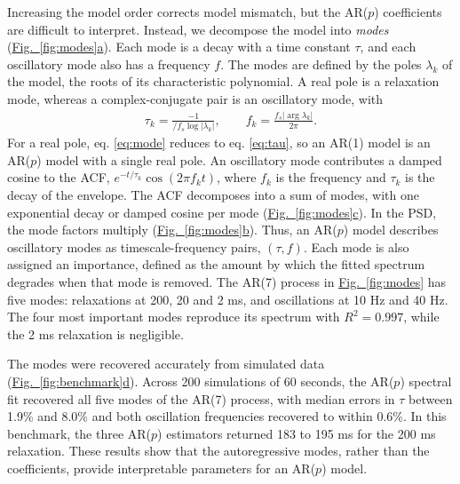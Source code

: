 \documentclass[pdflatex,lineno,sn-nature]{sn-jnl}
\newcommand{\figpanel}[3][]{\hyperref[#2]{Fig.~#1\ref*{#2}#3}}
\theoremstyle{thmstyleone}
\theoremstyle{thmstyletwo}
\theoremstyle{thmstylethree}
\begin{document}
Increasing the model order corrects model mismatch, but the AR($p$) coefficients are difficult to interpret. Instead, we decompose the model into \emph{modes} (\figpanel{fig:modes}{a}). Each mode is a decay with a time constant $\tau$, and each oscillatory mode also has a frequency $f$. The modes are defined by the poles $\lambda_k$ of the model, the roots of its characteristic polynomial. A real pole is a relaxation mode, whereas a complex-conjugate pair is an oscillatory mode, with
\begin{align}
\tau_k = \frac{-1}{/f_s \log|\lambda_k|}, \qquad f_k = \frac{f_s |\arg \lambda_k|}{2\pi}. \label{eq:mode}
\end{align}
For a real pole, eq. \ref{eq:mode} reduces to eq. \ref{eq:tau}, so an AR(1) model is an AR($p$) model with a single real pole. An oscillatory mode contributes a damped cosine to the ACF, $e^{-t/\tau_k}\cos(2\pi f_k t)$, where $f_k$ is the frequency and $\tau_k$ is the decay of the envelope. The ACF decomposes into a sum of modes, with one exponential decay or damped cosine per mode (\figpanel{fig:modes}{c}). In the PSD, the mode factors multiply (\figpanel{fig:modes}{b}). Thus, an AR($p$) model describes oscillatory modes as timescale-frequency pairs, $(\tau, f)$. Each mode is also assigned an importance, defined as the amount by which the fitted spectrum degrades when that mode is removed. The AR(7) process in \figpanel{fig:modes}{} has five modes: relaxations at 200, 20 and 2 ms, and oscillations at 10 Hz and 40 Hz. The four most important modes reproduce its spectrum with $R^2 = 0.997$, while the 2 ms relaxation is negligible.

The modes were recovered accurately from simulated data (\figpanel{fig:benchmark}{d}). Across 200 simulations of 60 seconds, the AR($p$) spectral fit recovered all five modes of the AR(7) process, with median errors in $\tau$ between 1.9\% and 8.0\% and both oscillation frequencies recovered to within 0.6\%. In this benchmark, the three AR($p$) estimators returned 183 to 195 ms for the 200 ms relaxation. These results show that the autoregressive modes, rather than the coefficients, provide interpretable parameters for an AR($p$) model.
\end{document}
